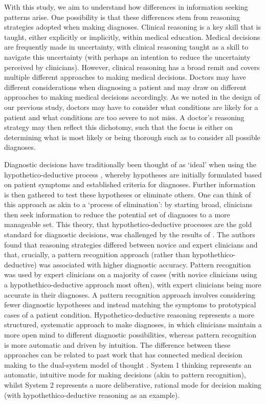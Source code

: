 \documentclass[a4paper, nobind]{templates/ociamthesis}
\begin{document}
\hfill\break
With this study, we aim to understand how differences in information seeking patterns arise. One possibility is that these differences stem from reasoning strategies adopted when making diagnoses. Clinical reasoning is a key skill that is taught, either explicitly or implicitly, within medical education. Medical decisions are frequently made in uncertainty, with clinical reasoning taught as a skill to navigate this uncertainty (with perhaps an intention to reduce the uncertainty perceived by clinicians). However, clinical reasoning has a broad remit and covers multiple different approaches to making medical decisions. Doctors may have different considerations when diagnosing a patient and may draw on different approaches to making medical decisions accordingly. As we noted in the design of our previous study, doctors may have to consider what conditions are likely for a patient and what conditions are too severe to not miss. A doctor's reasoning strategy may then reflect this dichotomy, such that the focus is either on determining what is most likely or being thorough such as to consider all possible diagnoses.

\hfill\break
Diagnostic decisions have traditionally been thought of as `ideal' when using the hypothetico-deductive process \autocite{kuipers_causal_1984}, whereby hypotheses are initially formulated based on patient symptoms and established criteria for diagnoses. Further information is then gathered to test these hypotheses \autocite{higgs_clinical_2019} or eliminate others. One can think of this approach as akin to a `process of elimination': by starting broad, clinicians then seek information to reduce the potential set of diagnoses to a more manageable set. This theory, that hypothetico-deductive processes are the gold standard for diagnostic decisions, was challenged by the results of \textcite{coderre_diagnostic_2003}. The authors found that reasoning strategies differed between novice and expert clinicians and that, crucially, a pattern recognition approach (rather than hypothethico-deductive) was associated with higher diagnostic accuracy. Pattern recognition was used by expert clinicians on a majority of cases (with novice clinicians using a hypothethico-deductive approach most often), with expert clinicians being more accurate in their diagnoses. A pattern recognition approach involves considering fewer diagnostic hypotheses and instead matching the symptoms to prototypical cases of a patient condition. Hypothetico-deductive reasoning represents a more structured, systematic approach to make diagnoses, in which clinicians maintain a more open mind to different diagnostic possibilities, whereas pattern recognition is more automatic and driven by intuition. The difference between these approaches can be related to past work \autocite{norman_etiology_2014} that has connected medical decision making to the dual-system model of thought \autocite{kahneman_thinking_2011}. System 1 thinking represents an automatic, intuitive mode for making decisions (akin to pattern recognition), whilst System 2 represents a more deliberative, rational mode for decision making (with hypothethico-deductive reasoning as an example).
\end{document}
